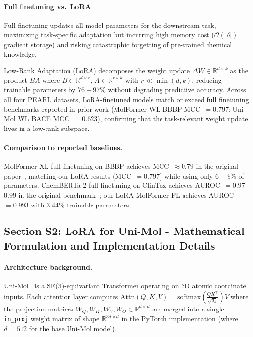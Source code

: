 \documentclass[9pt,a4paper]{article}
\begin{document}
\paragraph{Full finetuning vs.\ LoRA.}
Full finetuning updates all model parameters for the downstream task, maximizing task-specific adaptation but incurring high memory cost ($\mathcal{O}(|\theta|)$ gradient storage) and risking catastrophic forgetting of pre-trained chemical knowledge.

Low-Rank Adaptation (LoRA) decomposes the weight update $\Delta W \in \mathbb{R}^{d \times k}$
as the product $BA$ where $B \in \mathbb{R}^{d \times r}$, $A \in \mathbb{R}^{r \times k}$
with $r \ll \min(d, k)$, reducing trainable parameters by $76-97\%$ without degrading
predictive accuracy.
Across all four PEARL datasets, LoRA-finetuned models match or exceed full finetuning
benchmarks reported in prior work (MolFormer WL BBBP MCC~$= 0.797$; Uni-Mol WL BACE
MCC~$= 0.623$), confirming that the task-relevant weight update lives in a low-rank
subspace.

\paragraph{Comparison to reported baselines.}
MolFormer-XL full finetuning on BBBP achieves MCC~$\approx 0.79$ in the original paper~\cite{ross2022molformer}, matching our LoRA results (MCC~$= 0.797$) while using
only $6-9\%$ of parameters.
ChemBERTa-2 full finetuning on ClinTox achieves AUROC~$= 0.97$-$0.99$ in the
original benchmark~\cite{ahmad2022chemberta2}; our LoRA MolFormer FL achieves
AUROC~$= 0.993$ with $3.44\%$ trainable parameters.

\subsection*{Section S2: LoRA for Uni-Mol - Mathematical Formulation and
Implementation Details}

\paragraph{Architecture background.}
Uni-Mol~\cite{zhou2023unimol} is a SE(3)-equivariant Transformer operating on
3D atomic coordinate inputs.
Each attention layer computes
$\text{Attn}(Q, K, V) = \text{softmax}\!\left(\tfrac{QK^\top}{\sqrt{d_k}}\right)V$
where the projection matrices $W_Q, W_K, W_V, W_O \in \mathbb{R}^{d \times d}$
are merged into a single \texttt{in\_proj} weight matrix of shape
$\mathbb{R}^{3d \times d}$ in the PyTorch implementation
(where $d = 512$ for the base Uni-Mol model).
\end{document}
